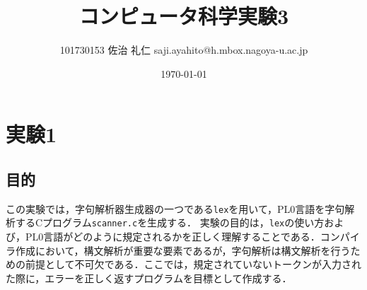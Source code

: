 \documentclass[uplatex]{jsarticle}
\title{コンピュータ科学実験3}
\author{101730153 佐治 礼仁 saji.ayahito@h.mbox.nagoya-u.ac.jp}
\date{\today}
\begin{document}
\maketitle
\section{実験1}
\subsection{目的}
この実験では，字句解析器生成器の一つである\verb#lex#を用いて，PL0言語を字句解析するCプログラム\verb#scanner.c#を生成する．
実験の目的は，\verb#lex#の使い方および，PL0言語がどのように規定されるかを正しく理解することである．コンパイラ作成において，構文解析が重要な要素であるが，字句解析は構文解析を行うための前提として不可欠である．ここでは，規定されていないトークンが入力された際に，エラーを正しく返すプログラムを目標として作成する．
\end{document}
